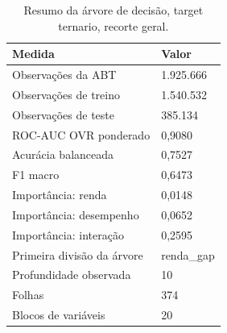 \begin{table}
\caption{Resumo da árvore de decisão, target ternario, recorte geral.}
\label{tab:tabela_treeClassification_ternario_recorte_geral_principal_holdout_80_20_e5}
\begin{tabular}{ll}
\toprule
Medida & Valor \\
\midrule
Observações da ABT & 1.925.666 \\
Observações de treino & 1.540.532 \\
Observações de teste & 385.134 \\
ROC-AUC OVR ponderado & 0,9080 \\
Acurácia balanceada & 0,7527 \\
F1 macro & 0,6473 \\
Importância: renda & 0,0148 \\
Importância: desempenho & 0,0652 \\
Importância: interação & 0,2595 \\
Primeira divisão da árvore & renda\_gap \\
Profundidade observada & 10 \\
Folhas & 374 \\
Blocos de variáveis & 20 \\
\bottomrule
\end{tabular}
\end{table}
